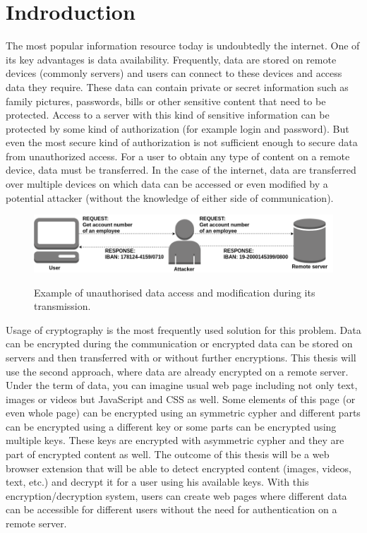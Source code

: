 \chapter{Indroduction}
The most popular information resource today is undoubtedly the internet. One of its key advantages is data availability. Frequently, data are stored on remote devices (commonly servers) and users can connect to these devices and access data they require. These data can contain private or secret information such as family pictures, passwords, bills or other sensitive content that need to be protected. Access to a server with this kind of sensitive information can be protected by some kind of authorization (for example login and password). But even the most secure kind of authorization is not sufficient enough to secure data from unauthorized access. For a user to obtain any type of content on a remote device, data must be transferred. In the case of the internet, data are transferred over multiple devices on which data can be accessed or even modified by a potential attacker (without the knowledge of either side of communication).

\begin{figure}[H]
    \begin{center}
        \label{img:unsecureConnection}
        \includegraphics[width=1.0\textwidth]{obrazky-figures/unsecureconnection.png}
        \caption{Example of unauthorised data access and modification during its transmission.}
    \end{center}
\end{figure}

Usage of cryptography is the most frequently used solution for this problem. Data can be encrypted during the communication or encrypted data can be stored on servers and then transferred with or without further encryptions. This thesis will use the second approach, where data are already encrypted on a remote server. Under the term of data, you can imagine usual web page including not only text, images or videos but JavaScript and CSS as well. Some elements of this page (or even whole page) can be encrypted using an symmetric cypher and different parts can be encrypted using a different key or some parts can be encrypted using multiple keys. These keys are encrypted with asymmetric cypher and they are part of encrypted content as well. The outcome of this thesis will be a web browser extension that will be able to detect encrypted content (images, videos, text, etc.) and decrypt it for a user using his available keys. With this encryption/decryption system, users can create web pages where different data can be accessible for different users without the need for authentication on a remote server.

